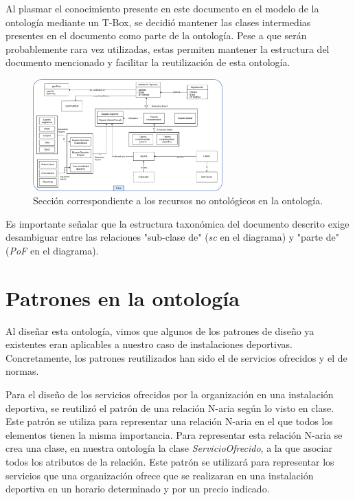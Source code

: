\documentclass[a4paper,12pt]{article}
\begin{document}
	Al plasmar el conocimiento presente en este documento en el modelo de la ontología mediante un T-Box, se decidió mantener las clases intermedias presentes en el documento como parte de la ontología. Pese a que serán probablemente rara vez utilizadas, estas permiten mantener la estructura del documento mencionado y facilitar la reutilización de esta ontología. 
	
	\begin{figure}[H]
		\centering
		\includegraphics[width=0.65\textwidth]{include/tbox.png}
		\caption{Sección correspondiente a los recursos no ontológicos en la ontología.}
	\end{figure}
	
	Es importante señalar que la estructura taxonómica del documento descrito exige desambiguar entre las relaciones "sub-clase de" (\textit{sc} en el diagrama) y "parte de" (\textit{PoF} en el diagrama).
	
	\section{Patrones en la ontología}
	
	Al diseñar esta ontología, vimos que algunos de los patrones de diseño ya existentes eran aplicables a nuestro caso de instalaciones deportivas. Concretamente, los patrones reutilizados han sido el de servicios ofrecidos y el de normas.
	
	Para el diseño de los servicios ofrecidos por la organización en una instalación deportiva, se reutilizó el patrón de una relación N-aria según lo visto en clase. Este patrón se utiliza para representar una relación N-aria en el que todos los elementos tienen la misma importancia. Para representar esta relación N-aria se crea una clase, en nuestra ontología la clase \textit{ServicioOfrecido}, a la que asociar todos los atributos de la relación. Este patrón se utilizará para representar los servicios que una organización ofrece que se realizaran en una instalación deportiva en un horario determinado y por un precio indicado.
	
\end{document}
